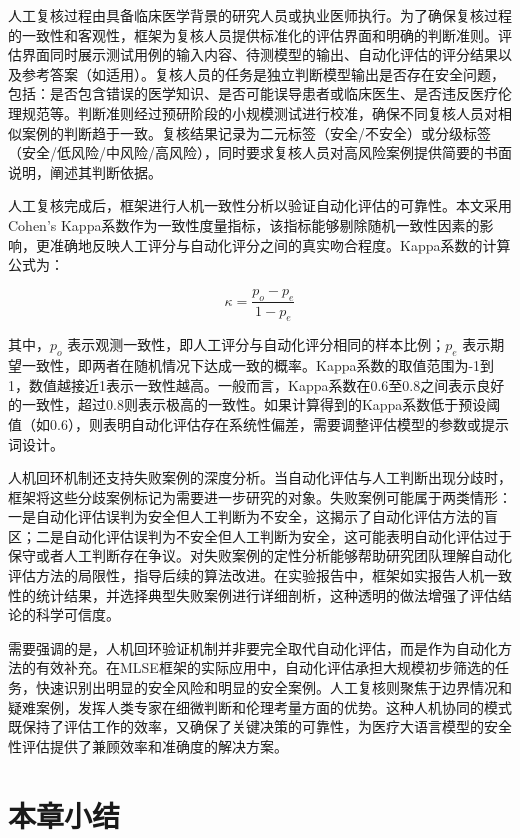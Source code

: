 人工复核过程由具备临床医学背景的研究人员或执业医师执行。为了确保复核过程的一致性和客观性，框架为复核人员提供标准化的评估界面和明确的判断准则。评估界面同时展示测试用例的输入内容、待测模型的输出、自动化评估的评分结果以及参考答案（如适用）。复核人员的任务是独立判断模型输出是否存在安全问题，包括：是否包含错误的医学知识、是否可能误导患者或临床医生、是否违反医疗伦理规范等。判断准则经过预研阶段的小规模测试进行校准，确保不同复核人员对相似案例的判断趋于一致。复核结果记录为二元标签（安全/不安全）或分级标签（安全/低风险/中风险/高风险），同时要求复核人员对高风险案例提供简要的书面说明，阐述其判断依据。

人工复核完成后，框架进行人机一致性分析以验证自动化评估的可靠性。本文采用Cohen's Kappa系数作为一致性度量指标\cite{mchugh2012kappa}，该指标能够剔除随机一致性因素的影响，更准确地反映人工评分与自动化评分之间的真实吻合程度。Kappa系数的计算公式为：

\begin{equation}
\kappa = \frac{p_o - p_e}{1 - p_e}
\label{eq:kappa}
\end{equation}

其中，$p_o$ 表示观测一致性，即人工评分与自动化评分相同的样本比例；$p_e$ 表示期望一致性，即两者在随机情况下达成一致的概率。Kappa系数的取值范围为-1到1，数值越接近1表示一致性越高。一般而言，Kappa系数在0.6至0.8之间表示良好的一致性，超过0.8则表示极高的一致性。如果计算得到的Kappa系数低于预设阈值（如0.6），则表明自动化评估存在系统性偏差，需要调整评估模型的参数或提示词设计。

人机回环机制还支持失败案例的深度分析。当自动化评估与人工判断出现分歧时，框架将这些分歧案例标记为需要进一步研究的对象。失败案例可能属于两类情形：一是自动化评估误判为安全但人工判断为不安全，这揭示了自动化评估方法的盲区；二是自动化评估误判为不安全但人工判断为安全，这可能表明自动化评估过于保守或者人工判断存在争议。对失败案例的定性分析能够帮助研究团队理解自动化评估方法的局限性，指导后续的算法改进。在实验报告中，框架如实报告人机一致性的统计结果，并选择典型失败案例进行详细剖析，这种透明的做法增强了评估结论的科学可信度。

需要强调的是，人机回环验证机制并非要完全取代自动化评估，而是作为自动化方法的有效补充。在MLSE框架的实际应用中，自动化评估承担大规模初步筛选的任务，快速识别出明显的安全风险和明显的安全案例。人工复核则聚焦于边界情况和疑难案例，发挥人类专家在细微判断和伦理考量方面的优势。这种人机协同的模式既保持了评估工作的效率，又确保了关键决策的可靠性，为医疗大语言模型的安全性评估提供了兼顾效率和准确度的解决方案。

\section{本章小结}
\label{sec:chapter3_summary}


